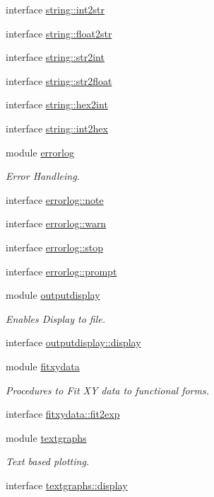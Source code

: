 \begin{DoxyCompactItemize}
interface \hyperlink{interfacestring_1_1int2str}{string\-::int2str}
\item 
interface \hyperlink{interfacestring_1_1float2str}{string\-::float2str}
\item 
interface \hyperlink{interfacestring_1_1str2int}{string\-::str2int}
\item 
interface \hyperlink{interfacestring_1_1str2float}{string\-::str2float}
\item 
interface \hyperlink{interfacestring_1_1hex2int}{string\-::hex2int}
\item 
interface \hyperlink{interfacestring_1_1int2hex}{string\-::int2hex}
\item 
module \hyperlink{classerrorlog}{errorlog}
\begin{DoxyCompactList}\small\item\em Error Handleing. \end{DoxyCompactList}\item 
interface \hyperlink{interfaceerrorlog_1_1note}{errorlog\-::note}
\item 
interface \hyperlink{interfaceerrorlog_1_1warn}{errorlog\-::warn}
\item 
interface \hyperlink{interfaceerrorlog_1_1stop}{errorlog\-::stop}
\item 
interface \hyperlink{interfaceerrorlog_1_1prompt}{errorlog\-::prompt}
\item 
module \hyperlink{classoutputdisplay}{outputdisplay}
\begin{DoxyCompactList}\small\item\em Enables Display to file. \end{DoxyCompactList}\item 
interface \hyperlink{interfaceoutputdisplay_1_1display}{outputdisplay\-::display}
\item 
module \hyperlink{classfitxydata}{fitxydata}
\begin{DoxyCompactList}\small\item\em Procedures to Fit X\-Y data to functional forms. \end{DoxyCompactList}\item 
interface \hyperlink{interfacefitxydata_1_1fit2exp}{fitxydata\-::fit2exp}
\item 
module \hyperlink{classtextgraphs}{textgraphs}
\begin{DoxyCompactList}\small\item\em Text based plotting. \end{DoxyCompactList}\item 
interface \hyperlink{interfacetextgraphs_1_1display}{textgraphs\-::display}
\end{DoxyCompactItemize}

